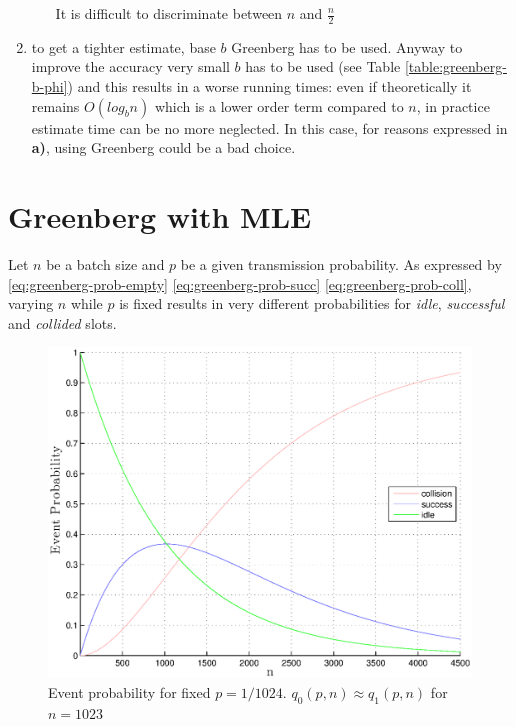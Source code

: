 \documentclass[12pt,a4paper]{report}
\begin{document}
\begin{enumerate}[\bf a)]
\begin{enumerate}[\it i.]
\begin{itemize}
		\end{itemize}
		It is difficult to discriminate between $n$ and $\frac{n}{2}$ 
	\end{enumerate}
\item to get a tighter estimate, base $b$ Greenberg has to be used. Anyway to improve the accuracy very small $b$ has to be used (see Table \ref{table:greenberg-b-phi}) and this results in a worse running times: even if theoretically it remains $O(log_{b}n)$ which is a lower order term compared to $n$, in practice estimate time can be no more neglected. In this case, for reasons expressed in {\bf a)}, using Greenberg  could be a bad choice.
\end{enumerate}

\section{Greenberg with MLE}

Let $n$ be a batch size and $p$ be a given transmission probability. As expressed by \eqref{eq:greenberg-prob-empty} \eqref{eq:greenberg-prob-succ} \eqref{eq:greenberg-prob-coll}, varying $n$ while $p$ is fixed results in very different probabilities for \emph{idle}, \emph{successful} and \emph{collided} slots.

\begin{figure}[H]
\begin{center}
\includegraphics[scale=.7]{matlab/Greenberg_MLE/draw_coll_idle_succ_fixed_p}
\caption[Event probability fixed $p$]{Event probability for fixed $p=1/1024$.  $q_{0}(p,n) \approx  q_{1}(p,n)$ for $n=1023$}
\end{center}
\end{figure}
\end{document}

